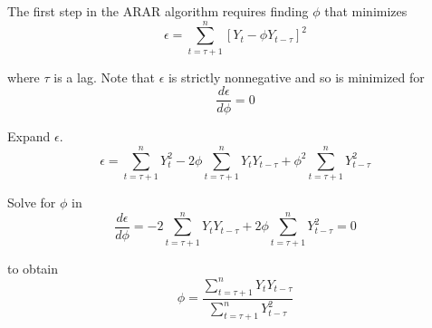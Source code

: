 \documentclass[12pt]{article}
\begin{document}
The first step in the ARAR algorithm requires finding $\phi$ that minimizes
\begin{equation*}
\epsilon=\sum_{t=\tau+1}^n[Y_t-\phi Y_{t-\tau}]^2
\end{equation*}

where $\tau$ is a lag.
Note that $\epsilon$ is strictly nonnegative and so is minimized for
\begin{equation*}
\frac{d\epsilon}{d\phi}=0
\end{equation*}

Expand $\epsilon$.
\begin{equation*}
\epsilon=\sum_{t=\tau+1}^nY_t^2-2\phi\sum_{t=\tau+1}^nY_tY_{t-\tau}+\phi^2\sum_{t=\tau+1}^nY_{t-\tau}^2
\end{equation*}

Solve for $\phi$ in
\begin{equation*}
\frac{d\epsilon}{d\phi}=-2\sum_{t=\tau+1}^nY_tY_{t-\tau}+2\phi\sum_{t=\tau+1}^nY_{t-\tau}^2=0
\end{equation*}

to obtain
\begin{equation*}
\phi=\frac{\sum_{t=\tau+1}^nY_tY_{t-\tau}}{\sum_{t=\tau+1}^nY_{t-\tau}^2}
\end{equation*}
\end{document}
